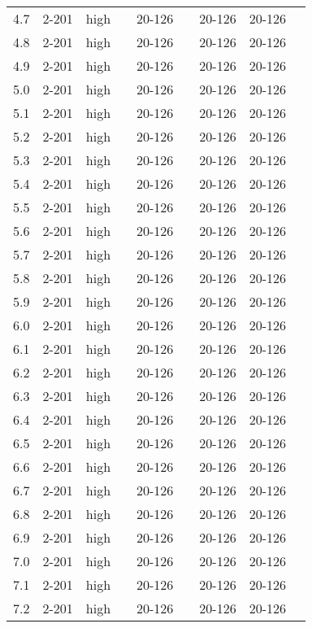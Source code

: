 \documentclass{article}
\begin{document}
\begin{center}
\begin{tabular}{| c | c | c | c | c | c | c | c | c |}
      4.7 & 2-201 & high &  & 20-126 &  & 20-126 & 20-126 &\\
      4.8 & 2-201 & high &  & 20-126 &  & 20-126 & 20-126 &\\
      4.9 & 2-201 & high &  & 20-126 &  & 20-126 & 20-126 &\\
      5.0 & 2-201 & high &  & 20-126 &  & 20-126 & 20-126 &\\
      5.1 & 2-201 & high &  & 20-126 &  & 20-126 & 20-126 &\\
      5.2 & 2-201 & high &  & 20-126 &  & 20-126 & 20-126 &\\
      5.3 & 2-201 & high &  & 20-126 &  & 20-126 & 20-126 &\\
      5.4 & 2-201 & high &  & 20-126 &  & 20-126 & 20-126 &\\
      5.5 & 2-201 & high &  & 20-126 &  & 20-126 & 20-126 &\\
      5.6 & 2-201 & high &  & 20-126 &  & 20-126 & 20-126 &\\
      5.7 & 2-201 & high &  & 20-126 &  & 20-126 & 20-126 &\\
      5.8 & 2-201 & high &  & 20-126 &  & 20-126 & 20-126 &\\
      5.9 & 2-201 & high &  & 20-126 &  & 20-126 & 20-126 &\\
      6.0 & 2-201 & high &  & 20-126 &  & 20-126 & 20-126 &\\
      6.1 & 2-201 & high &  & 20-126 &  & 20-126 & 20-126 &\\
      6.2 & 2-201 & high &  & 20-126 &  & 20-126 & 20-126 &\\
      6.3 & 2-201 & high &  & 20-126 &  & 20-126 & 20-126 &\\
      6.4 & 2-201 & high &  & 20-126 &  & 20-126 & 20-126 &\\
      6.5 & 2-201 & high &  & 20-126 &  & 20-126 & 20-126 &\\
      6.6 & 2-201 & high &  & 20-126 &  & 20-126 & 20-126 &\\
      6.7 & 2-201 & high &  & 20-126 &  & 20-126 & 20-126 &\\
      6.8 & 2-201 & high &  & 20-126 &  & 20-126 & 20-126 &\\
      6.9 & 2-201 & high &  & 20-126 &  & 20-126 & 20-126 &\\
      7.0 & 2-201 & high &  & 20-126 &  & 20-126 & 20-126 &\\
      7.1 & 2-201 & high &  & 20-126 &  & 20-126 & 20-126 &\\
      7.2 & 2-201 & high &  & 20-126 &  & 20-126 & 20-126 &\\

\end{tabular}
\end{center}
\end{document}
